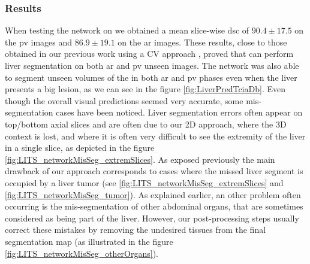 \subsubsection{Results}\label{liver_segmentation_tcia_db_results}

When testing the  network on \textbf{} we
obtained a mean slice-wise \ac{dsc} of $ 90.4 \pm 17.5 $ on the \ac{pv} images and
$ 86.9 \pm 19.1 $ on the \ac{ar} images. These results, close to those obtained
in our previous work using a CV approach \cite{Ouhmich2019}, proved that  can
perform liver segmentation on both \ac{ar} and \ac{pv} unseen images.
The  network was also able to segment unseen volumes of the
\textbf{} in both \ac{ar} and \ac{pv} phases even when the liver presents a big
lesion, as we can see in the figure \ref{fig:LiverPredTciaDb}.
Even though the overall visual predictions seemed very accurate, some mis-segmentation cases have been noticed. Liver segmentation errors often appear on top/bottom axial slices and are often due to our 2D approach, where the 3D context is lost, and where it is often very difficult to see the extremity of the liver in a single slice, as depicted in the figure \ref{fig:LITS_networkMisSeg_extremSlices}. As exposed previously the main drawback of our approach corresponds to cases where the missed liver segment is occupied by a liver tumor (see \ref{fig:LITS_networkMisSeg_extremSlices} and \ref{fig:LITS_networkMisSeg_tumor}).
As explained earlier, an other problem often occurring is the mis-segmentation of other abdominal organs, that are sometimes considered as being part of the liver. However, our post-processing steps usually correct these mistakes by removing the undesired tissues from the final segmentation map (as illustrated in the figure \ref{fig:LITS_networkMisSeg_otherOrgans}).


